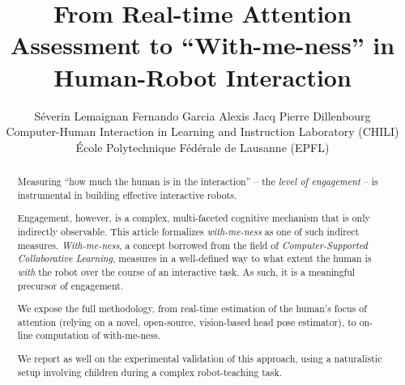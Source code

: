 \documentclass{sig-alternate}
\begin{document}
%

\title{From Real-time Attention Assessment to ``With-me-ness'' in Human-Robot Interaction}
\author{Séverin Lemaignan \qquad Fernando Garcia \qquad Alexis Jacq \qquad Pierre Dillenbourg\\Computer-Human Interaction in Learning and Instruction Laboratory (CHILI)\\École Polytechnique Fédérale de Lausanne (EPFL)}


\maketitle
\begin{abstract}

Measuring ``how much the human is in the interaction'' -- the \emph{level of
engagement} -- is instrumental in building effective interactive robots.

Engagement, however, is a complex, multi-faceted cognitive mechanism that is
only indirectly observable. This article formalizes \emph{with-me-ness} as one
of such indirect measures. \emph{With-me-ness}, a concept borrowed from the
field of {\it Computer-Supported Collaborative Learning}, measures in a
well-defined way to what extent the human is \emph{with} the robot over the
course of an interactive task. As such, it is a meaningful precursor of
engagement.

We expose the full methodology, from real-time estimation of the human's focus
of attention (relying on a novel, open-source, vision-based head pose
estimator), to on-line computation of with-me-ness.

We report as well on the experimental validation of this approach, using a
naturalistic setup involving children during a complex robot-teaching task.

\end{abstract}

\end{document}
